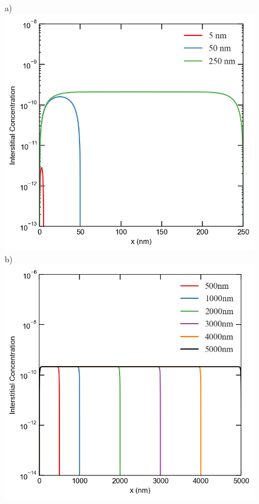 \documentclass[utf8]{frontiersSCNS} %
\begin{document}
    \begin{figure}[h!]
        \centering
        a)\includegraphics[scale=0.55]{Fig4_a}\\
        b)\includegraphics[scale=0.35]{Fig4_b}

\end{figure}
\end{document}
